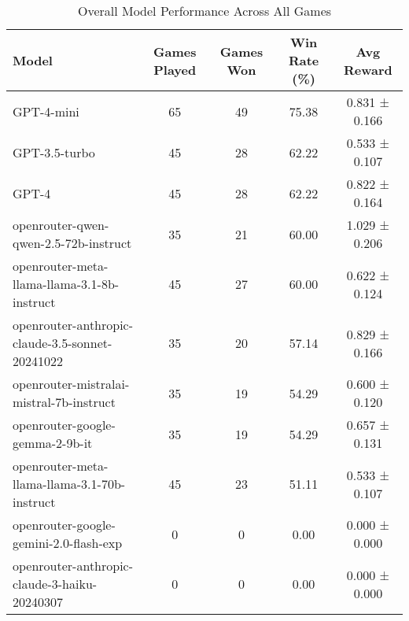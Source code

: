 \begin{table}[htbp]
\centering
\caption{Overall Model Performance Across All Games}
\begin{tabular}{lcccc}
\toprule
Model & Games Played & Games Won & Win Rate (\%) & Avg Reward \\
\midrule
GPT-4-mini & 65 & 49 & 75.38 & 0.831 ± 0.166 \\
GPT-3.5-turbo & 45 & 28 & 62.22 & 0.533 ± 0.107 \\
GPT-4 & 45 & 28 & 62.22 & 0.822 ± 0.164 \\
openrouter-qwen-qwen-2.5-72b-instruct & 35 & 21 & 60.00 & 1.029 ± 0.206 \\
openrouter-meta-llama-llama-3.1-8b-instruct & 45 & 27 & 60.00 & 0.622 ± 0.124 \\
openrouter-anthropic-claude-3.5-sonnet-20241022 & 35 & 20 & 57.14 & 0.829 ± 0.166 \\
openrouter-mistralai-mistral-7b-instruct & 35 & 19 & 54.29 & 0.600 ± 0.120 \\
openrouter-google-gemma-2-9b-it & 35 & 19 & 54.29 & 0.657 ± 0.131 \\
openrouter-meta-llama-llama-3.1-70b-instruct & 45 & 23 & 51.11 & 0.533 ± 0.107 \\
openrouter-google-gemini-2.0-flash-exp & 0 & 0 & 0.00 & 0.000 ± 0.000 \\
openrouter-anthropic-claude-3-haiku-20240307 & 0 & 0 & 0.00 & 0.000 ± 0.000 \\
\bottomrule
\end{tabular}
\end{table}
